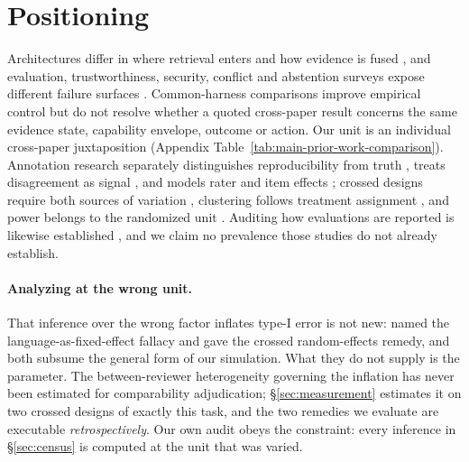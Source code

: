 \documentclass[11pt]{article}
\begin{document}
\section{Positioning}
\label{sec:related}

Architectures differ in where retrieval enters and how evidence is fused
\citep{drqa2017,knnlm2020,fid2021,retro2022,atlas2023,replug2024}, and
evaluation, trustworthiness, security, conflict and abstention surveys expose
different failure surfaces \citep{ragSurvey2024,ragEvaluationSurvey2024,
trustRAGCompass2024,securityRAGSurvey2026,xuKnowledgeConflicts2024,
wenAbstentionSurvey2025}. Common-harness comparisons improve empirical control
\citep{ragBestPractices2024,alushiRAGComparison2026} but do not resolve whether
a quoted cross-paper result concerns the same evidence state, capability
envelope, outcome or action. Our unit is an individual cross-paper
juxtaposition (Appendix Table~\ref{tab:main-prior-work-comparison}). Annotation
research separately distinguishes reproducibility from truth
\citep{artstein2008intercoder,dawid1979observer}, treats disagreement as signal
\citep{uma2021disagreement,plank2022labelvariation,davani2022disagreements},
and models rater and item effects
\citep{passonneau2014annotation,paun2018bayesian}; crossed designs require both
sources of variation \citep{baayen2008crossed}, clustering follows treatment
assignment \citep{abadie2023clustering}, and power belongs to the randomized
unit \citep{card2020power,vanmiltenburg2021preregistering}. Auditing how
evaluations are reported is likewise established
\citep{howcroft2020twenty,vanderlee2021human,belz2021systematic,
belz2023impossibility,clark2021human}, and we claim no prevalence those studies
do not already establish.

\paragraph{Analyzing at the wrong unit.}
That inference over the wrong factor inflates type-I error is not new:
\citet{clark1973language} named the language-as-fixed-effect fallacy and
\citet{judd2012stimuli} gave the crossed random-effects remedy, and both
subsume the general form of our simulation. What they do not supply is the
parameter. The between-reviewer heterogeneity governing the inflation has never
been estimated for comparability adjudication; \S\ref{sec:measurement} estimates
it on two crossed designs of exactly this task, and the two remedies we evaluate
are executable \emph{retrospectively}. Our own audit obeys the constraint:
every inference in \S\ref{sec:census} is computed at the unit that was varied.
\end{document}
